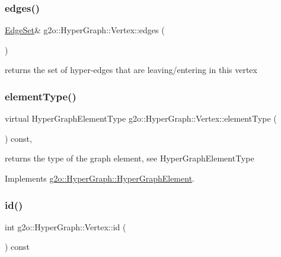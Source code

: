 \subsubsection{\texorpdfstring{edges()}{edges()}\hspace{0.1cm}{\footnotesize\ttfamily [2/2]}}
{\footnotesize\ttfamily \mbox{\hyperlink{classg2o_1_1_hyper_graph_a5e2970e236c0dcb4eff7c205d7b6b4ae}{Edge\+Set}}\& g2o\+::\+Hyper\+Graph\+::\+Vertex\+::edges (\begin{DoxyParamCaption}{ }\end{DoxyParamCaption})\hspace{0.3cm}{\ttfamily [inline]}}



returns the set of hyper-\/edges that are leaving/entering in this vertex 

\mbox{\label{classg2o_1_1_hyper_graph_1_1_vertex_a8f214b9065b88a3aafff7442380476ab}} 
\subsubsection{\texorpdfstring{element\+Type()}{elementType()}}
{\footnotesize\ttfamily virtual Hyper\+Graph\+Element\+Type g2o\+::\+Hyper\+Graph\+::\+Vertex\+::element\+Type (\begin{DoxyParamCaption}{ }\end{DoxyParamCaption}) const\hspace{0.3cm}{\ttfamily [inline]}, {\ttfamily [virtual]}}

returns the type of the graph element, see Hyper\+Graph\+Element\+Type 

Implements \mbox{\hyperlink{structg2o_1_1_hyper_graph_1_1_hyper_graph_element_a1a9d7b748698c09d202373e06e413ef2}{g2o\+::\+Hyper\+Graph\+::\+Hyper\+Graph\+Element}}.

\mbox{\label{classg2o_1_1_hyper_graph_1_1_vertex_a48191960395856d1b686287489e53da3}} 
\subsubsection{\texorpdfstring{id()}{id()}}
{\footnotesize\ttfamily int g2o\+::\+Hyper\+Graph\+::\+Vertex\+::id (\begin{DoxyParamCaption}{ }\end{DoxyParamCaption}) const\hspace{0.3cm}{\ttfamily [inline]}}



